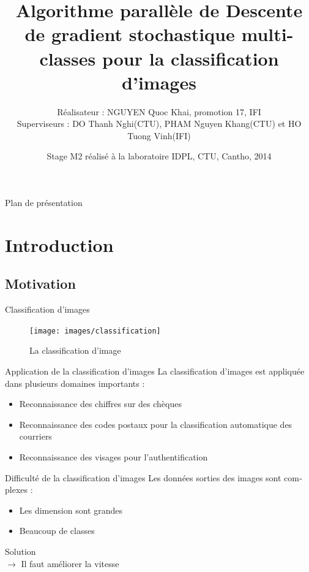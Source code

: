 \documentclass[11pt]{beamer}
\title{Algorithme parallèle de Descente de gradient stochastique multi-classes pour la classification d'images
}
\author[1]{Réalisateur : NGUYEN Quoc Khai, promotion 17, IFI \\[\baselineskip]
Superviseurs : DO Thanh Nghi(CTU), PHAM Nguyen Khang(CTU) et HO Tuong Vinh(IFI)
}
\date{Stage M2 réalisé à la laboratoire IDPL, CTU, Cantho, 2014}
\begin{document}
\begin{otherlanguage}{french}
\begin{frame}
  \titlepage
\end{frame}


\begin{frame}{Plan de présentation}
  \tableofcontents
\end{frame}


\section{Introduction}
\subsection{Motivation}
\begin{frame}{Classification d'images}
\begin{figure}[ht!]
\centering
\texttt{[image: images/classification]}
\caption{La classification d'image}
\vspace{-2.0em}
\label{fig:classification}
\end{figure}
\end{frame}

\begin{frame}{Application de la classification d'images}
La classification d'images est appliquée dans plusieurs domaines importants :
\begin{itemize}
\pause
\item Reconnaissance des chiffres sur des chèques
\pause
\item Reconnaissance des codes postaux pour la classification automatique des courriers
\pause
\item Reconnaissance des visages pour l'authentification
\end{itemize}
\end{frame}

\begin{frame}{Difficulté de la classification d'images}
Les données sorties des images sont complexes :
\begin{itemize}
\pause
\item Les dimension sont grandes
\pause
\item Beaucoup de classes
\end{itemize}
\pause
Solution\\
$\rightarrow$ Il faut améliorer la vitesse
\end{frame}


\end{otherlanguage}
\end{document}
